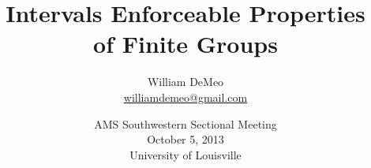 \RequirePackage{snapshot}
\newcommand{\ConfColor}{darkred}

\newtheorem{prop}[theorem]{Proposition}
\newtheorem{assumption}[theorem]{Assumption}
\theoremstyle{definition}
\newtheorem{question}[theorem]{Question}
\newtheorem{claim}[claim]{Claim}
\newtheorem{conjecture}[conjecture]{Conjecture}
\newtheorem{case}{Case}
\theoremstyle{remark}
\newtheorem*{computations}{Computations}
\newtheorem*{remark}{Remark}
\newtheorem*{remarks}{Remarks}
\newtheorem*{notation}{Notation}
\newtheorem*{exs}{Examples}
\newtheorem*{ex}{Example}

 \newcommand{\IE}{{\small IE}}
 \newcommand{\defn}[1]{\textcolor{\ConfColor}{\textit{\textbf{#1}}}}
\title[IE Properties]{Intervals Enforceable Properties\\of Finite Groups}

\author[William DeMeo]{William DeMeo\\
{\small \url{williamdemeo@gmail.com}}}

\date[]{\vskip1cm
AMS Southwestern Sectional Meeting\\[6pt]
October 5, 2013\\[6pt]
{\color{darkred}University of Louisville}
}



